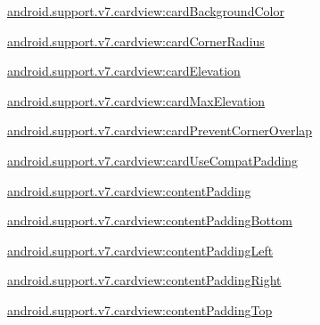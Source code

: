 {\ttfamily \hyperlink{classandroid_1_1support_1_1v7_1_1cardview_1_1R_1_1styleable_a9371dc0e42bf75930b7e2c770cd55985}{android.\+support.\+v7.\+cardview\+:card\+Background\+Color}}

{\ttfamily \hyperlink{classandroid_1_1support_1_1v7_1_1cardview_1_1R_1_1styleable_aace2dfda6017f1faa65e0083e27d22c2}{android.\+support.\+v7.\+cardview\+:card\+Corner\+Radius}}

{\ttfamily \hyperlink{classandroid_1_1support_1_1v7_1_1cardview_1_1R_1_1styleable_a722e279b5228de84f205a2cff6f3fea5}{android.\+support.\+v7.\+cardview\+:card\+Elevation}}

{\ttfamily \hyperlink{classandroid_1_1support_1_1v7_1_1cardview_1_1R_1_1styleable_a07d7edea3f37f66423d90bc58c1bc837}{android.\+support.\+v7.\+cardview\+:card\+Max\+Elevation}}

{\ttfamily \hyperlink{classandroid_1_1support_1_1v7_1_1cardview_1_1R_1_1styleable_ae36059e966df9b6eab68d01218774027}{android.\+support.\+v7.\+cardview\+:card\+Prevent\+Corner\+Overlap}}

{\ttfamily \hyperlink{classandroid_1_1support_1_1v7_1_1cardview_1_1R_1_1styleable_a32c785b85bf780371d8996ca17967eec}{android.\+support.\+v7.\+cardview\+:card\+Use\+Compat\+Padding}}

{\ttfamily \hyperlink{classandroid_1_1support_1_1v7_1_1cardview_1_1R_1_1styleable_ac1c8de17031173bc157d0bd6b488c607}{android.\+support.\+v7.\+cardview\+:content\+Padding}}

{\ttfamily \hyperlink{classandroid_1_1support_1_1v7_1_1cardview_1_1R_1_1styleable_a04aea907d43f247611fdaa27549aa94b}{android.\+support.\+v7.\+cardview\+:content\+Padding\+Bottom}}

{\ttfamily \hyperlink{classandroid_1_1support_1_1v7_1_1cardview_1_1R_1_1styleable_aaad29bef85433a8e7f930c1f2c8491f0}{android.\+support.\+v7.\+cardview\+:content\+Padding\+Left}}

{\ttfamily \hyperlink{classandroid_1_1support_1_1v7_1_1cardview_1_1R_1_1styleable_a628bf5a056adce073b9e664d4a2f4d14}{android.\+support.\+v7.\+cardview\+:content\+Padding\+Right}}

{\ttfamily \hyperlink{classandroid_1_1support_1_1v7_1_1cardview_1_1R_1_1styleable_a5027a3856e6f3bdd41006d07bbd06823}{android.\+support.\+v7.\+cardview\+:content\+Padding\+Top}}

